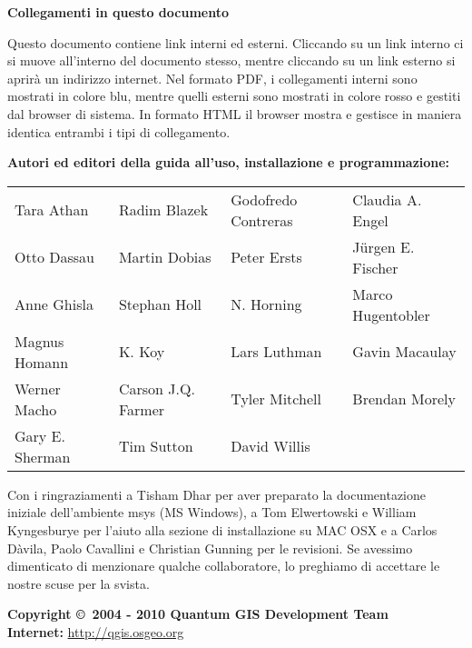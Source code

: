 \textbf{Collegamenti in questo documento}

Questo documento contiene link interni ed esterni. Cliccando su un
link interno ci si muove all'interno del documento stesso, mentre
cliccando su un link esterno si aprirà un indirizzo internet. Nel
formato PDF, i collegamenti interni sono mostrati in colore blu,
mentre quelli esterni sono mostrati in colore rosso e gestiti dal
browser di sistema. In formato HTML il browser mostra e gestisce in
maniera identica entrambi i tipi di collegamento.

\begin{flushleft}
\textbf{Autori ed editori della guida all'uso, installazione e programmazione:}

\begin{tabular}{p{4cm} p{4cm} p{4cm}}
Tara Athan & Radim Blazek & Godofredo Contreras & Claudia A. Engel \\
Otto Dassau & Martin Dobias & Peter Ersts & J\"urgen E. Fischer \\ 
Anne Ghisla & Stephan Holl & N. Horning & Marco Hugentobler \\ 
Magnus Homann & K. Koy & Lars Luthman & Gavin Macaulay \\
Werner Macho & Carson J.Q. Farmer & Tyler Mitchell & Brendan Morely \\
Gary E. Sherman & Tim Sutton & David Willis \\
\end{tabular}

\end{flushleft}

Con i ringraziamenti a Tisham Dhar per aver preparato la documentazione
iniziale dell'ambiente msys (MS Windows), a Tom Elwertowski e William
Kyngesburye per l'aiuto alla sezione di installazione su MAC OSX e
a Carlos Dàvila, Paolo Cavallini e Christian Gunning per le revisioni.
Se avessimo dimenticato di menzionare qualche collaboratore, lo preghiamo
di accettare le nostre scuse per la svista.

\textbf{Copyright \copyright~2004 - 2010 Quantum GIS Development Team} \\
\textbf{Internet:} \url{http://qgis.osgeo.org}